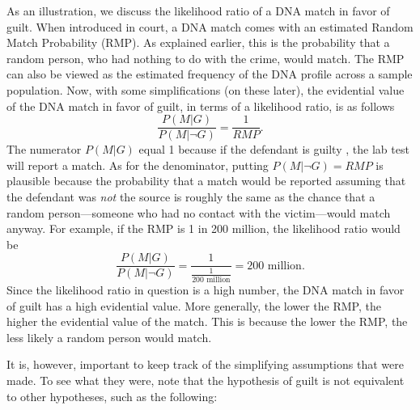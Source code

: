 \documentclass[10pt]{article}
\begin{document}
As an illustration, we discuss the likelihood ratio 
of a DNA match in favor of guilt. %
When introduced in court, a DNA match comes with an 
estimated Random Match Probability (RMP).  As explained earlier, this
is the probability that a random person, who 
had nothing to do with the crime, would match. The RMP can also be viewed 
as the estimated frequency of the DNA profile across a sample population. 
%
Now, with some simplifications (on these later), 
the evidential value of the DNA 
match in favor of guilt, in terms of a likelihood ratio, 
is as follows %
%
\[
\frac{P(M | G)}{P(M | \neg G)} =   \frac{1}{RMP}.
\]
%
The numerator $P(M | G)$ equal 1 because %
if the defendant is guilty%
, the lab test will report a match. As for the denominator, 
putting $P(M | \neg G)=RMP$ is plausible because the probability that a match would be reported assuming that the defendant was \textit{not} 
the source is roughly the same as the chance that a random person---someone who had no contact with the victim---would match anyway. 
For example, if the RMP is 1 in 200 million, the likelihood ratio would be
%
\[\frac{P(M |G)}{P( M | \neg G)}=\frac{1}{\frac{1}{\text{200 million}}}=\text{200 million}.\]
%
Since the likelihood ratio in question is a high number, the DNA match in favor of guilt 
has a high evidential value. More generally,  the lower the RMP, the higher the evidential value of the match. This is because 
the lower the RMP, the less likely a random person would match. 

It is, however, important to keep track of the simplifying assumptions that were made. 
To see what they were, note that the hypothesis of guilt is not equivalent to 
other hypotheses, such as the following: %
\end{document}
